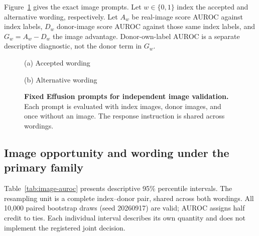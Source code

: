 \clearpage
Figure~\ref{fig:image-readout-prompts} gives the exact image prompts.
Let $w\in\{0,1\}$ index the accepted and alternative wording,
respectively. Let $A_w$ be real-image score AUROC against index labels,
$D_w$ donor-image score AUROC against those same index labels, and
$G_w=A_w-D_w$ the image advantage. Donor-own-label AUROC is a separate
descriptive diagnostic, not the donor term in $G_w$.

\begin{figure}[H]
\centering
{}\par
{\small (a) Accepted wording}\par\medskip
{}\par
{\small (b) Alternative wording}
\caption{\textbf{Fixed Effusion prompts for independent image validation.}
Each prompt is evaluated with index images, donor images, and once without
an image. The response instruction is shared across wordings.}
\label{fig:image-readout-prompts}
\end{figure}

\subsection{Image opportunity and wording under the primary family}

Table~\ref{tab:image-auroc} presents descriptive 95\% percentile intervals.
The resampling unit is a complete index--donor pair, shared across both
wordings. All 10,000 paired bootstrap draws (seed 20260917) are valid;
AUROC assigns half credit to ties. Each individual interval describes its
own quantity and does not implement the registered joint decision.

\begin{table}[H]
\centering
\caption{Real-image and donor-image answer discrimination.}
\label{tab:image-auroc}
\end{table}

